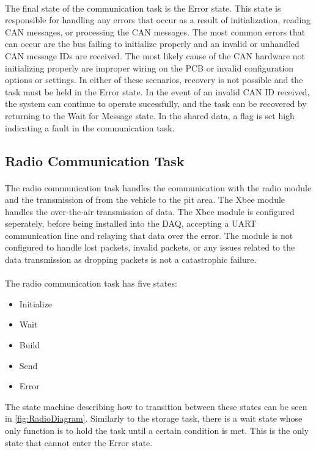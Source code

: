 \paragraph{}
The final state of the communication task is the Error state.
This state is responsible for handling any errors that occur as a result of initialization, reading CAN messages, or processing the CAN messages.
The most common errors that can occur are the bus failing to initialize properly and an invalid or unhandled CAN message IDs are received.
The most likely cause of the CAN hardware not initializing properly are improper wiring on the PCB or invalid configuration options or settings.
In either of these scenarios, recovery is not possible and the task must be held in the Error state.
In the event of an invalid CAN ID received, the system can continue to operate sucessfully, and the task can be recovered by returning to the Wait for Message state.
In the shared data, a flag is set high indicating a fault in the communication task.

\subsection{Radio Communication Task}

\paragraph{}
The radio communication task handles the communication with the radio module and the transmission of from the vehicle to the pit area.
The Xbee module handles the over-the-air transmission of data.
The Xbee module is configured seperately, before being installed into the DAQ, accepting a UART communication line and relaying that data over the error.
The module is not configured to handle lost packets, invalid packets, or any issues related to the data transmission as dropping packets is not a catastrophic failure.

\paragraph{}
The radio communication task has five states:
\begin{itemize}
	\item Initialize
	\item Wait
	\item Build
	\item Send
	\item Error
\end{itemize}
The state machine describing how to transition between these states can be seen in \cref{fig:RadioDiagram}.
Similarly to the storage task, there is a wait state whose only function is to hold the task until a certain condition is met.
This is the only state that cannot enter the Error state.

